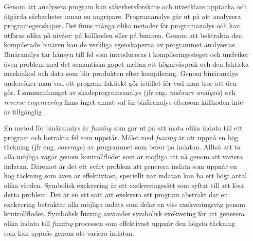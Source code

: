 Genom att analysera program kan säkerhetsforskare och utvecklare upptäcka
och åtgärda sårbarheter innan en angripare. Programanalys går ut på att
analysera programegenskaper. Det finns många olika metoder för programanalys
och kan utföras olika på nivåer: på källkoden eller på binären. Genom att
bektrakta den kompilerade binären kan de verkliga egenskaperna av programmet
analyseras. Binäranalys tar hänsyn till fel som introduceras i
kompileringssteget och undviker även problem med det semantiska gapet mellan
ett högnivåspråk och den faktiska maskinkod och data som blir produkten efter
kompilering. Genom binäranalys undersöker man vad ett program faktiskt gör
istället för vad man tror att den gör. I sammanhanget av skadeprogramsanalys
(jfr eng. \emph{malware analysis}) och \emph{reverse engeneering} finns inget
annat val än binäranalys eftersom källkoden inte är
tillgänglig~\cite{andriesse2018}.

En metod för binäranalys är \emph{fuzzing} som går ut på att mata olika indata
till ett program och betrakta fel som uppstår. Målet med \emph{fuzzing} är att
uppnå en hög täckning (jfr eng. \emph{coverage}) av programmet som beror
på indatan. Alltså att ta alla möjliga vägar genom kontrollflödet som är
möjliga att nå genom att variera indatan. Däremot är det ett svårt problem att
generera indata som uppnår en hög täckning som även är effektivtast, speciellt
när indatan kan ha ett högt antal olika värden. Symbolisk exekvering är ett
exekveringssätt som syftar till att lösa detta problem. Det är en ett sätt att
exekvera ett program abstrakt där en exekvering betraktar alla möjliga indata
som delar en viss exekveringsväg genom kontrollflödet. Symbolisk fuzzing
använder symbolisk exekvering för att generera olika indata till \emph{fuzzing}
processen som effektivast uppnår den högsta täckning som kan uppnås genom att
variera indatan.

